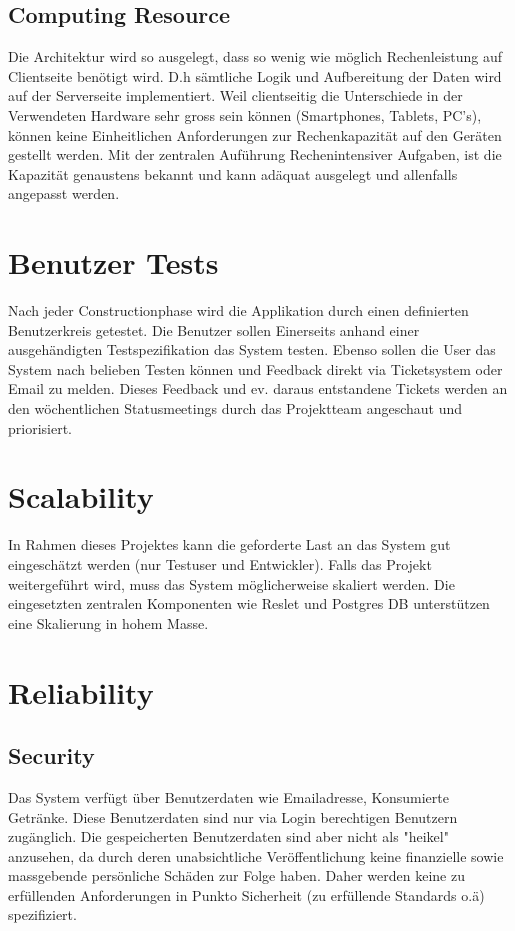 \documentclass[10pt,a4paper]{scrartcl}
\begin{document}
\subsection{Computing Resource}
Die Architektur wird so ausgelegt, dass so wenig wie möglich Rechenleistung auf Clientseite benötigt wird. D.h sämtliche Logik und Aufbereitung der Daten wird auf der Serverseite implementiert. Weil clientseitig die Unterschiede in der Verwendeten Hardware sehr gross sein können (Smartphones, Tablets, PC's), können keine Einheitlichen Anforderungen zur Rechenkapazität auf den Geräten gestellt werden. Mit der zentralen Auführung Rechenintensiver Aufgaben, ist die Kapazität genaustens bekannt und kann adäquat ausgelegt und allenfalls angepasst werden.

\section{Benutzer Tests}
Nach jeder Constructionphase wird die Applikation durch einen definierten Benutzerkreis getestet. Die Benutzer sollen Einerseits anhand einer ausgehändigten Testspezifikation das System testen. Ebenso sollen die User das System nach belieben Testen können und Feedback direkt via Ticketsystem oder Email zu melden. Dieses Feedback und ev. daraus entstandene  Tickets werden an den wöchentlichen Statusmeetings durch das Projektteam angeschaut und priorisiert.

\section{Scalability}
In Rahmen dieses Projektes kann die geforderte Last an das System gut eingeschätzt werden (nur Testuser und Entwickler). Falls das Projekt weitergeführt wird, muss das System möglicherweise skaliert werden. Die eingesetzten zentralen Komponenten wie Reslet und Postgres DB unterstützen eine Skalierung in hohem Masse.
\section{Reliability}
\subsection{Security}
Das System verfügt über Benutzerdaten wie Emailadresse, Konsumierte Getränke. Diese Benutzerdaten sind nur via Login berechtigen Benutzern zugänglich. Die gespeicherten Benutzerdaten sind aber nicht als "heikel" anzusehen, da durch deren unabsichtliche Veröffentlichung keine finanzielle sowie massgebende persönliche Schäden zur Folge haben. Daher werden keine zu erfüllenden Anforderungen in Punkto Sicherheit (zu erfüllende Standards o.ä) spezifiziert.
\end{document}
